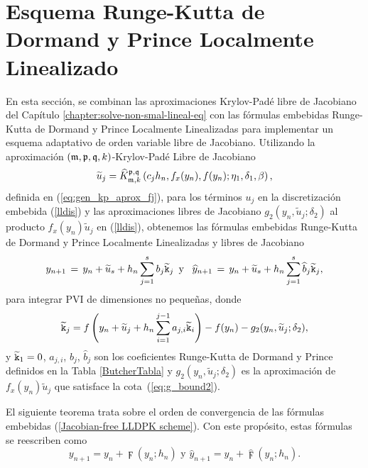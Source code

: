 \section{Esquema Runge-Kutta de Dormand y Prince Localmente Linealizado}
En esta sección, se combinan las aproximaciones Krylov-Padé libre de Jacobiano del Capítulo \ref{chapter:solve-non-smal-lineal-eq} con las fórmulas embebidas Runge-Kutta de Dormand y Prince Localmente Linealizadas para implementar un esquema adaptativo de orden variable libre de Jacobiano.
Utilizando la aproximación $(\mathfrak{m} , \mathfrak{p} ,\mathfrak{q} , k)$-Krylov-Padé Libre de Jacobiano
\begin{equation}
\widetilde{u}_j=\widehat{K}_{\mathfrak{m},k}^{\mathfrak{p},\mathfrak{q}}\left(c_j h_n, f_x(y_n) , f(y_n); \eta_1, \delta_1, \beta \right) \label{eq:approx_u_j},
\end{equation}
definida en (\ref{eq:gen_kp_aprox_fj}), para los términos $u_j$ en la discretización embebida (\ref{lldis}) y las aproximaciones libres de Jacobiano $g_2(y_n,\widetilde{u}_j;\delta_2)$ al producto  $f_x(y_n)\widetilde{u}_j$ en (\ref{lldis}), obtenemos las fórmulas embebidas Runge-Kutta de Dormand y Prince Localmente Linealizadas y libres de Jacobiano
\begin{equation}
	y_{n+1}\,=\,y_n+\widetilde{u}_s+h_n \sum_{j=1}^{s}b_j \widetilde{\mathtt{k}}_j \,\,\, \text{y} \,\,\, \
	\widehat{y}_{n+1}\,=\, y_n+\widetilde{u}_s+h_n \sum_{j=1}^{s}\widehat{b}_j \widetilde{\mathtt{k}}_j, \label{Jacobian-free LLDPK scheme}
	\end{equation}
para integrar PVI de dimensiones no pequeñas, donde
\begin{equation*}
	\widetilde{\mathtt{k}}_j = f\left( y_n+\widetilde{u}_j+h_n \sum_{i=1}^{j-1}a_{j,i}\widetilde{\mathtt{k}}_i \right) - f( y_n) - g_2(y_n,\widetilde{u}_j;\delta_2),
\end{equation*}
y $\widetilde{\mathtt{k}}_1=0$, $a_{j,i}$, $b_j$, $\widehat{b}_j$ son los coeficientes Runge-Kutta de Dormand y Prince definidos en la Tabla \ref{ButcherTabla} y  $g_2(y_n,\widetilde{u}_j;\delta_2)$ es la aproximación de $f_x(y_n)\widetilde{u}_j$ que satisface la cota~(\ref{eq:g_bound2}).

El siguiente teorema trata sobre el orden de convergencia de las fórmulas embebidas (\ref{Jacobian-free LLDPK scheme}). Con este propósito, estas fórmulas se reescriben como
\begin{equation*}
    y_{n+1}=y_{n}+\digamma (y_{n};h_{n})\text{ \ \ \ \ y \ \ \ \ }\widehat{y}_{n+1}=y_{n}+\widehat{\digamma }(y_{n};h_{n}).
\end{equation*}


